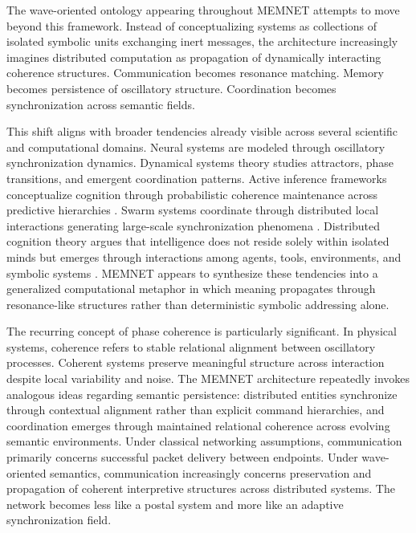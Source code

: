 \documentclass[11pt,a4paper]{article}
\begin{document}
The wave-oriented ontology appearing throughout MEMNET attempts to move beyond this framework. Instead of conceptualizing systems as collections of isolated symbolic units exchanging inert messages, the architecture increasingly imagines distributed computation as propagation of dynamically interacting coherence structures. Communication becomes resonance matching. Memory becomes persistence of oscillatory structure. Coordination becomes synchronization across semantic fields.

This shift aligns with broader tendencies already visible across several scientific and computational domains. Neural systems are modeled through oscillatory synchronization dynamics. Dynamical systems theory studies attractors, phase transitions, and emergent coordination patterns. Active inference frameworks conceptualize cognition through probabilistic coherence maintenance across predictive hierarchies \cite{friston2010}. Swarm systems coordinate through distributed local interactions generating large-scale synchronization phenomena \cite{bonabeau1999}. Distributed cognition theory argues that intelligence does not reside solely within isolated minds but emerges through interactions among agents, tools, environments, and symbolic systems \cite{hutchins1995}. MEMNET appears to synthesize these tendencies into a generalized computational metaphor in which meaning propagates through resonance-like structures rather than deterministic symbolic addressing alone.

The recurring concept of phase coherence is particularly significant. In physical systems, coherence refers to stable relational alignment between oscillatory processes. Coherent systems preserve meaningful structure across interaction despite local variability and noise. The MEMNET architecture repeatedly invokes analogous ideas regarding semantic persistence: distributed entities synchronize through contextual alignment rather than explicit command hierarchies, and coordination emerges through maintained relational coherence across evolving semantic environments. Under classical networking assumptions, communication primarily concerns successful packet delivery between endpoints. Under wave-oriented semantics, communication increasingly concerns preservation and propagation of coherent interpretive structures across distributed systems. The network becomes less like a postal system and more like an adaptive synchronization field.
\end{document}
